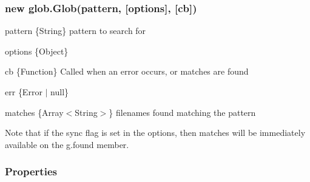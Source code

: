 \subsubsection*{new glob.\+Glob(pattern, \mbox{[}options\mbox{]}, \mbox{[}cb\mbox{]})}


\begin{DoxyItemize}
\item {\ttfamily pattern} {\ttfamily \{String\}} pattern to search for
\item {\ttfamily options} {\ttfamily \{Object\}}
\item {\ttfamily cb} {\ttfamily \{Function\}} Called when an error occurs, or matches are found
\begin{DoxyItemize}
\item {\ttfamily err} {\ttfamily \{Error $\vert$ null\}}
\item {\ttfamily matches} {\ttfamily \{Array$<$String$>$\}} filenames found matching the pattern
\end{DoxyItemize}
\end{DoxyItemize}

Note that if the {\ttfamily sync} flag is set in the options, then matches will be immediately available on the {\ttfamily g.\+found} member.

\subsubsection*{Properties}


